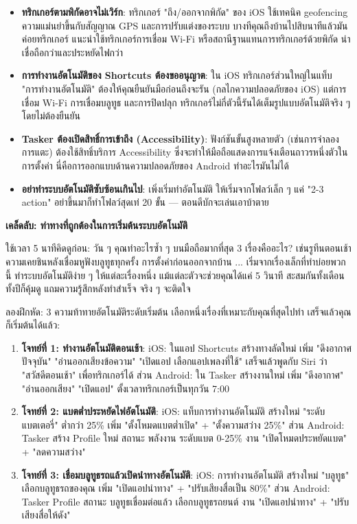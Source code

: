\begin{itemize}
  \item \textbf{ทริกเกอร์ตามพิกัดอาจไม่เวิร์ก}: ทริกเกอร์ "ถึง/ออกจากพิกัด" ของ iOS ใช้เทคนิค geofencing ความแม่นยำขึ้นกับสัญญาณ GPS และการปรับแต่งของระบบ บางทีคุณถึงบ้านไปสิบนาทีแล้วมันค่อยทริกเกอร์ แนะนำใช้ทริกเกอร์การเชื่อม Wi-Fi หรือสถานีฐานแทนการทริกเกอร์ด้วยพิกัด น่าเชื่อถือกว่าและประหยัดไฟกว่า
  \item \textbf{การทำงานอัตโนมัติของ Shortcuts ต้องขออนุญาต}: ใน iOS ทริกเกอร์ส่วนใหญ่ในแท็บ "การทำงานอัตโนมัติ" ต้องให้คุณยืนยันมือก่อนถึงจะรัน (กลไกความปลอดภัยของ iOS) แต่การเชื่อม Wi-Fi การเชื่อมบลูทูธ และการปิดปลุก ทริกเกอร์ไม่กี่ตัวนี้รันได้เต็มรูปแบบอัตโนมัติจริง ๆ โดยไม่ต้องยืนยัน
  \item \textbf{Tasker ต้องเปิดสิทธิ์การเข้าถึง (Accessibility)}: ฟังก์ชันขั้นสูงหลายตัว (เช่นการจำลองการแตะ) ต้องใช้สิทธิ์บริการ Accessibility ซึ่งจะทำให้มือถือแสดงการแจ้งเตือนถาวรหนึ่งตัวในการตั้งค่า นี่คือการออกแบบด้านความปลอดภัยของ Android ทำอะไรมันไม่ได้
  \item \textbf{อย่าทำระบบอัตโนมัติซับซ้อนเกินไป}: เพิ่งเริ่มทำอัตโนมัติ ให้เริ่มจากโฟลว์เล็ก ๆ แค่ "2-3 action" อย่าขึ้นมาก็ทำโฟลว์สุดเท่ 20 ขั้น — ตอนดีบักจะเล่นเอาบ้าตาย
\end{itemize}

\textbf{เคล็ดลับ: ท่าทางที่ถูกต้องในการเริ่มต้นระบบอัตโนมัติ}\par

ใช้เวลา 5 นาทีคิดดูก่อน: วัน ๆ คุณทำอะไรซ้ำ ๆ บนมือถือมากที่สุด 3 เรื่องคืออะไร? เช่นรูทีนตอนเช้า ความเคยชินหลังเชื่อมหูฟังบลูทูธทุกครั้ง การตั้งค่าก่อนออกจากบ้าน ... เริ่มจากเรื่องเล็กที่ทำบ่อยพวกนี้ ทำระบบอัตโนมัติง่าย ๆ ให้แต่ละเรื่องหนึ่ง แม้แต่ละตัวจะช่วยคุณได้แค่ 5 วินาที สะสมกันทั้งเดือนทั้งปีก็คุ้มดู แถมความรู้สึกหลังทำสำเร็จ จริง ๆ จะติดใจ

\begin{tcbpractice}{ลองฝึกหัด: 3 ความท้าทายอัตโนมัติระดับเริ่มต้น}
เลือกหนึ่งเรื่องที่เหมาะกับคุณที่สุดไปทำ เสร็จแล้วคุณก็เริ่มต้นได้แล้ว:

\begin{enumerate}
  \item \textbf{โจทย์ที่ 1: ทำงานอัตโนมัติตอนเช้า}: iOS: ในแอป Shortcuts สร้างทางลัดใหม่ เพิ่ม "ดึงอากาศปัจจุบัน" "อ่านออกเสียงข้อความ" "เปิดแอป เลือกแอปเพลงที่ใช้" เสร็จแล้วพูดกับ Siri ว่า "สวัสดีตอนเช้า" เพื่อทริกเกอร์ได้ ส่วน Android: ใน Tasker สร้างงานใหม่ เพิ่ม "ดึงอากาศ" "อ่านออกเสียง" "เปิดแอป" ตั้งเวลาทริกเกอร์เป็นทุกวัน 7:00
  \item \textbf{โจทย์ที่ 2: แบตต่ำประหยัดไฟอัตโนมัติ}: iOS: แท็บการทำงานอัตโนมัติ สร้างใหม่ "ระดับแบตเตอรี่" ต่ำกว่า 25\% เพิ่ม "ตั้งโหมดแบตต่ำเปิด" + "ตั้งความสว่าง 25\%" ส่วน Android: Tasker สร้าง Profile ใหม่ สถานะ พลังงาน ระดับแบต 0-25\% งาน "เปิดโหมดประหยัดแบต" + "ลดความสว่าง"
  \item \textbf{โจทย์ที่ 3: เชื่อมบลูทูธรถแล้วเปิดนำทางอัตโนมัติ}: iOS: การทำงานอัตโนมัติ สร้างใหม่ "บลูทูธ" เลือกบลูทูธรถของคุณ เพิ่ม "เปิดแอปนำทาง" + "ปรับเสียงสื่อเป็น 80\%" ส่วน Android: Tasker Profile สถานะ บลูทูธเชื่อมต่อแล้ว เลือกบลูทูธรถยนต์ งาน "เปิดแอปนำทาง" + "ปรับเสียงสื่อให้ดัง"
\end{enumerate}

\end{tcbpractice}

